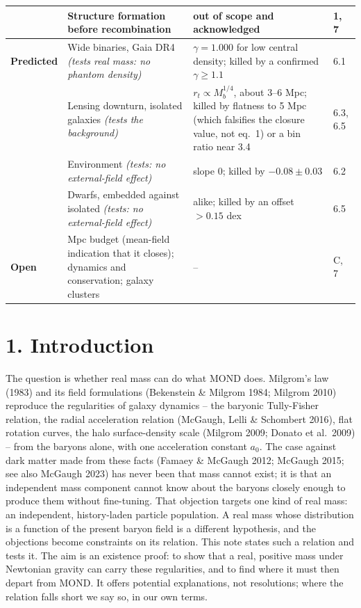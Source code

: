 \documentclass[
  10pt,
]{article}
\begin{document}
{\begin{longtable}[]{@{}p{2.0cm}p{6.0cm}p{5.5cm}p{1.5cm}@{}}
 & Structure formation before recombination & out of scope and acknowledged & 1, 7\tabularnewline
\midrule
\textbf{Predicted} & Wide binaries, Gaia DR4 \emph{(tests real mass: no phantom density)} & $\gamma=1.000$ for low central density; killed by a confirmed $\gamma\ge1.1$ & 6.1\tabularnewline
 & Lensing downturn, isolated galaxies \emph{(tests the background)} & $r_t\propto M_b^{1/4}$, about 3--6 Mpc; killed by flatness to 5 Mpc (which falsifies the closure value, not eq.~1) or a bin ratio near 3.4 & 6.3, 6.5\tabularnewline
 & Environment \emph{(tests: no external-field effect)} & slope 0; killed by $-0.08\pm0.03$ & 6.2\tabularnewline
 & Dwarfs, embedded against isolated \emph{(tests: no external-field effect)} & alike; killed by an offset $>0.15$ dex & 6.5\tabularnewline
\midrule
\textbf{Open} & Mpc budget (mean-field indication that it closes); dynamics and conservation; galaxy clusters & -- & C, 7\tabularnewline
\bottomrule
\end{longtable}}


\section{1. Introduction}\label{introduction}

The question is whether real mass can do what MOND does. Milgrom's law (1983) and its field formulations (Bekenstein \& Milgrom 1984; Milgrom 2010) reproduce the regularities of galaxy dynamics -- the baryonic Tully-Fisher relation, the radial acceleration relation (McGaugh, Lelli \& Schombert 2016), flat rotation curves, the halo surface-density scale (Milgrom 2009; Donato et al.~2009) -- from the baryons alone, with one acceleration constant $a_0$. The case against dark matter made from these facts (Famaey \& McGaugh 2012; McGaugh 2015; see also McGaugh 2023) has never been that mass cannot exist; it is that an independent mass component cannot know about the baryons closely enough to produce them without fine-tuning. That objection targets one kind of real mass: an independent, history-laden particle population. A real mass whose distribution is a function of the present baryon field is a different hypothesis, and the objections become constraints on its relation. This note states such a relation and tests it. The aim is an existence proof: to show that a real, positive mass under Newtonian gravity can carry these regularities, and to find where it must then depart from MOND. It offers potential explanations, not resolutions; where the relation falls short we say so, in our own terms.
\end{document}
